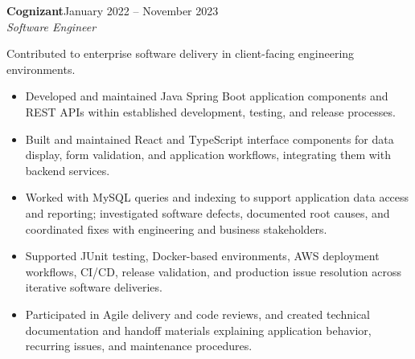 \documentclass[11pt,letterpaper]{article}
\newcommand{\entry}[3]{\needspace{11\baselineskip}\noindent\textbf{#1}\hfill #3\\[-1pt]\textit{#2}\par}
\begin{document}
\entry{Cognizant}{Software Engineer}{January 2022 -- November 2023}
Contributed to enterprise software delivery in client-facing engineering environments.
\begin{itemize}
\item Developed and maintained Java Spring Boot application components and REST APIs within established development, testing, and release processes.
\item Built and maintained React and TypeScript interface components for data display, form validation, and application workflows, integrating them with backend services.
\item Worked with MySQL queries and indexing to support application data access and reporting; investigated software defects, documented root causes, and coordinated fixes with engineering and business stakeholders.
\item Supported JUnit testing, Docker-based environments, AWS deployment workflows, CI/CD, release validation, and production issue resolution across iterative software deliveries.
\item Participated in Agile delivery and code reviews, and created technical documentation and handoff materials explaining application behavior, recurring issues, and maintenance procedures.
\end{itemize}\vspace{2pt}
\end{document}
